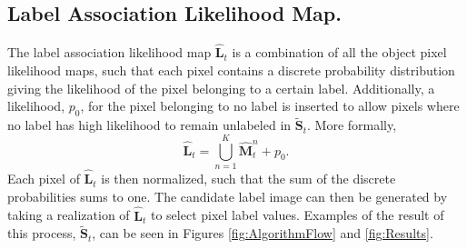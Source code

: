 \subsection{Label Association Likelihood Map.}
\label{sec:LabelAssocLikelihoodMap}
The label association likelihood map $\hat{\mathbf{L}}_{t}$ is a combination of all the object pixel likelihood maps, such that each pixel contains a discrete probability distribution giving the likelihood of the pixel belonging to a certain label.  Additionally, a likelihood, $p_0$, for the pixel belonging to no label is inserted to allow pixels where no label has high likelihood to remain unlabeled in  $\tilde{\mathbf{S}}_{t}$. More formally, 
\begin{equation}
\hat{\mathbf{L}}_{t} = \bigcup_{n=1}^{K} \hat{\mathbf{M}}^{n}_{t} + p_0. 
\label{eqn:LabelMap}
\end{equation}
Each pixel of $\hat{\mathbf{L}}_{t}$ is then normalized, such that the sum of the discrete probabilities sums to one. The candidate label image can then be generated by taking a realization of $\mathbf{\hat{L}}_{t}$ to select pixel label values. Examples of the result of this process, $\tilde{\mathbf{S}}_{t}$, can be seen in Figures \ref{fig:AlgorithmFlow} and \ref{fig:Results}.

